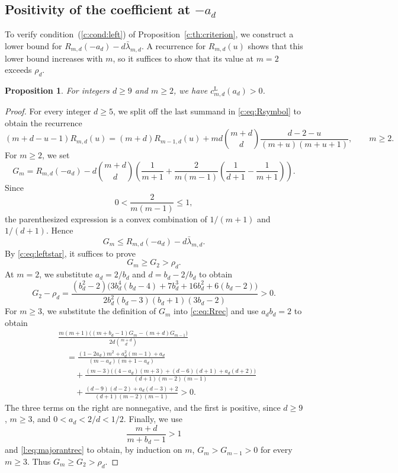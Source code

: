 \documentclass[10pt,a4paper]{article}
\numberwithin{equation}{section}
\newtheorem{proposition}[theorem]{Proposition}
\theoremstyle{remark}\newtheorem{remark}[theorem]{Remark}
\begin{document}
\subsection{Positivity of the coefficient at \texorpdfstring{$-a_d$}{-a}}\label{sec:leftcoeff}
To verify condition~(\ref{c:cond:left}) of Proposition~\ref{c:th:criterion},
we construct a lower bound for
$R_{m,d}(-a_d)-d\bar\lambda_{m,d}$.
A recurrence for $R_{m,d}(u)$ shows that this lower bound increases with $m$,
so it suffices to show that its value at $m=2$ exceeds $\rho_d$.
\begin{proposition}\label{l:prop:smallpole}
For integers $d\ge9$ and $m\ge2$, we have
$c_{m,d}^{\mathrm L}(a_d)>0$.
\end{proposition}
\begin{proof}
For every integer $d\ge5$, we split off the last summand in
\eqref{c:eq:Rsymbol} to obtain the recurrence
\begin{equation}\label{c:eq:Rrec}
 (m+d-u-1)R_{m,d}(u)=(m+d)R_{m-1,d}(u)
 +md\binom{m+d}{d}\frac{d-2-u}{(m+u)(m+u+1)},\qquad m\ge2.
\end{equation}
For $m\ge2$, we set
\[
 G_m=R_{m,d}(-a_d)-d\binom{m+d}{d}
 \left(\frac1{m+1}+\frac2{m(m-1)}
 \left(\frac1{d+1}-\frac1{m+1}\right)\right).
\]
Since
\[
 0<\frac{2}{m(m-1)}\le1,
\]
the parenthesized expression is a convex
combination of $1/(m+1)$ and $1/(d+1)$. Hence
\[
 G_m\le R_{m,d}(-a_d)-d\bar\lambda_{m,d}.
\]
By \eqref{c:eq:leftstar}, it suffices to prove
\[
 G_m\ge G_2>\rho_d.
\]
At $m=2$, we substitute $a_d=2/b_d$ and $d=b_d-2/b_d$ to obtain
\[
 G_2-\rho_d=
 \frac{(b_d^2-2)\bigl(3b_d^4(b_d-4)+7b_d^3+16b_d^2+6(b_d-2)\bigr)}
 {2b_d^2(b_d-3)(b_d+1)(3b_d-2)}>0.
\]
For $m\ge3$, we substitute the definition of $G_m$ into
\eqref{c:eq:Rrec} and use $a_db_d=2$ to obtain
\begin{equation}\label{l:eq:majorantrec}
\begin{split}
 &\frac{m(m+1)\bigl((m+b_d-1)G_m-(m+d)G_{m-1}\bigr)}
 {2d\binom{m+d}{d}}\\
 &\quad=
 \frac{(1-2a_d)m^2+a_d^2(m-1)+a_d}{(m-a_d)(m+1-a_d)}
 \\
 &\qquad+\frac{(m-3)\bigl((4-a_d)(m+3)+(d-6)(d+1)+a_d(d+2)\bigr)}
 {(d+1)(m-2)(m-1)}\\
 &\qquad+\frac{(d-9)(d-2)+a_d(d-3)+2}{(d+1)(m-2)(m-1)}>0.
\end{split}
\end{equation}
The three terms on the right are nonnegative, and the first is positive,
since $d\ge9$, $m\ge3$, and $0<a_d<2/d<1/2$.
Finally, we use
\[
 \frac{m+d}{m+b_d-1}>1
\]
and \eqref{l:eq:majorantrec} to obtain, by induction on $m$,
$G_m>G_{m-1}>0$ for every $m\ge3$. Thus $G_m\ge G_2>\rho_d$.
\end{proof}
\end{document}
